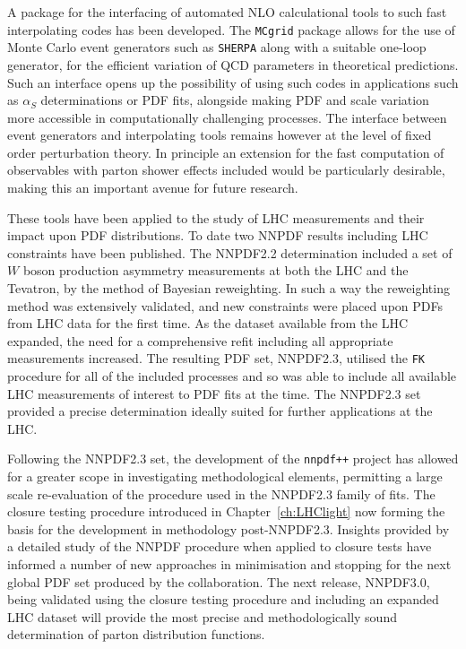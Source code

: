 A package for the interfacing of automated NLO calculational tools to such fast interpolating codes has been developed. The {\tt MCgrid} package allows for the use of Monte Carlo event generators such as {\tt SHERPA} along with a suitable one-loop generator, for the efficient variation of QCD parameters in theoretical predictions. Such an interface opens up the possibility of using such codes in applications such as $\alpha_S$ determinations or PDF fits, alongside making PDF and scale variation more accessible in computationally challenging processes. The interface between event generators and interpolating tools remains however at the level of fixed order perturbation theory. In principle an extension for the fast computation of observables with parton shower effects included would be particularly desirable, making this an important avenue for future research.

These tools have been applied to the study of LHC measurements and their impact upon PDF distributions. To date two NNPDF results including LHC constraints have been published. The NNPDF2.2 determination included a set of $W$ boson production asymmetry measurements at both the LHC and the Tevatron, by the method of Bayesian reweighting. In such a way the reweighting method was extensively validated, and new constraints were placed upon PDFs from LHC data for the first time. As the dataset available from the LHC expanded, the need for a comprehensive refit including all appropriate measurements increased. The resulting PDF set, NNPDF2.3, utilised the {\tt FK} procedure for all of the included processes and so was able to include all available LHC measurements of interest to PDF fits at the time. The NNPDF2.3 set provided a precise determination ideally suited for further applications at the LHC.

Following the NNPDF2.3 set, the development of the {\tt nnpdf++} project has allowed for a greater scope in investigating methodological elements, permitting a large scale re-evaluation of the procedure used in the NNPDF2.3 family of fits. The closure testing procedure introduced in Chapter~\ref{ch:LHClight} now forming the basis for the development in methodology post-NNPDF2.3. Insights provided by a detailed study of the NNPDF procedure when applied to closure tests have informed a number of new approaches in minimisation and stopping for the next global PDF set produced by the collaboration. The next release, NNPDF3.0, being validated using the closure testing procedure and including an expanded LHC dataset will provide the most precise and methodologically sound determination of parton distribution functions.
